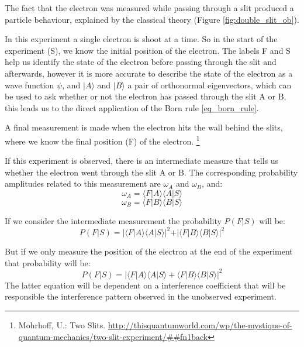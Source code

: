 The fact that the electron was measured while passing through a slit produced a particle behaviour, explained by the classical theory (Figure \ref{fig:double_slit_ob}). 


In this experiment a single electron is shoot at a time. So in the start of the experiment (S), we know the initial position of the electron. The labels F and S help us identify the state of the electron before passing through the slit and afterwards, however it is more accurate to describe the state of the electron as a wave function $\psi$, and $\vert A \rangle$ and $\vert B \rangle$ a pair of orthonormal eigenvectors, which can be used to ask whether or not the electron has passed through the slit A or B, this leads us to the direct application of the Born rule \eqref{eq_born_rule}.

A final measurement is made when the electron hits the wall behind the slits, where we know the final position (F) of the electron.
\footnote{Mohrhoff, U.: Two Slits. \url{http://thisquantumworld.com/wp/the-mystique-of-quantum-mechanics/two-slit-experiment/##fn1back}}

If this experiment is observed, there is an intermediate measure that tells us whether the electron went through the slit A or B. The corresponding probability amplitudes related to this measurement are $\omega_{A}$ and $\omega_{B}$, and:
\begin{equation}
\omega_{A} = \langle F \vert A\rangle \langle A \vert S\rangle
\end{equation}
\begin{equation}
\omega_{B} = \langle F \vert B\rangle \langle B \vert S\rangle
\end{equation}

If we consider the intermediate measurement the probability $P(F\vert S)$ will be:
\begin{equation}
P(F\vert S) = 
\vert \langle F \vert A\rangle \langle A \vert S\rangle \vert^{2}
+
\vert \langle F \vert B\rangle \langle B \vert S\rangle \vert^{2}
\end{equation}



But if we only measure the position of the electron at the end of the experiment that probability will be:
\begin{equation}
P(F\vert S) = 
\vert \langle F \vert A\rangle \langle A \vert S\rangle 
+
 \langle F \vert B\rangle \langle B \vert S\rangle \vert^{2}
\end{equation}
The latter equation will be dependent on a interference coefficient that will be responsible the interference pattern observed in the unobserved experiment.

